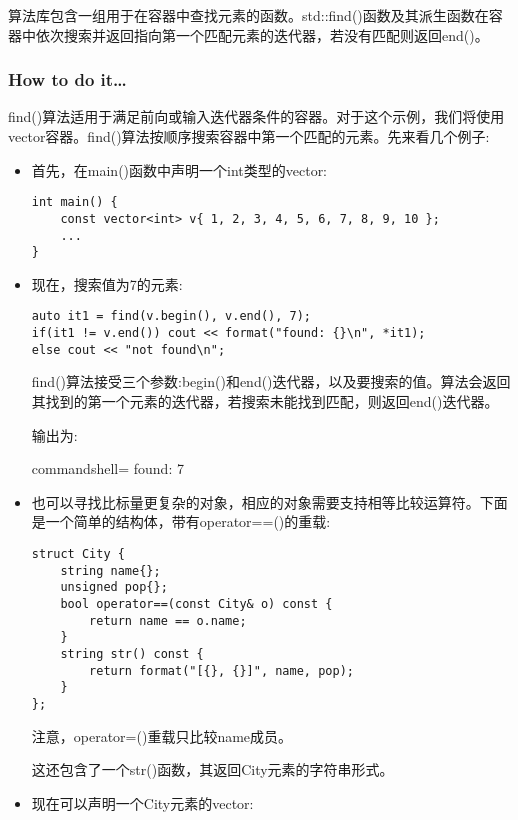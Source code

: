 
算法库包含一组用于在容器中查找元素的函数。std::find()函数及其派生函数在容器中依次搜索并返回指向第一个匹配元素的迭代器，若没有匹配则返回end()。

\subsubsection{How to do it…}

find()算法适用于满足前向或输入迭代器条件的容器。对于这个示例，我们将使用vector容器。find()算法按顺序搜索容器中第一个匹配的元素。先来看几个例子:

\begin{itemize}
\item 
首先，在main()函数中声明一个int类型的vector:

\begin{lstlisting}[style=styleCXX]
int main() {
	const vector<int> v{ 1, 2, 3, 4, 5, 6, 7, 8, 9, 10 };
	...
}
\end{lstlisting}

\item 
现在，搜索值为7的元素:

\begin{lstlisting}[style=styleCXX]
auto it1 = find(v.begin(), v.end(), 7);
if(it1 != v.end()) cout << format("found: {}\n", *it1);
else cout << "not found\n";
\end{lstlisting}

find()算法接受三个参数:begin()和end()迭代器，以及要搜索的值。算法会返回其找到的第一个元素的迭代器，若搜索未能找到匹配，则返回end()迭代器。

输出为:

\begin{tcblisting}{commandshell={}}
found: 7
\end{tcblisting}

\item 
也可以寻找比标量更复杂的对象，相应的对象需要支持相等比较运算符。下面是一个简单的结构体，带有operator==()的重载:

\begin{lstlisting}[style=styleCXX]
struct City {
	string name{};
	unsigned pop{};
	bool operator==(const City& o) const {
		return name == o.name;
	}
	string str() const {
		return format("[{}, {}]", name, pop);
	}
};
\end{lstlisting}

注意，operator=()重载只比较name成员。

这还包含了一个str()函数，其返回City元素的字符串形式。

\item 
现在可以声明一个City元素的vector:


\end{itemize}
